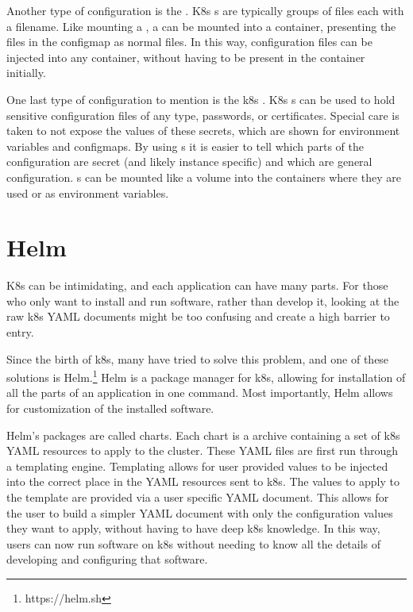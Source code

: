 \documentclass[11pt,twoside]{article}
\begin{document}
Another type of configuration is the .  K8s s are typically
groups of files each with a filename.  Like mounting a , a 
can be mounted into a container, presenting the files in the configmap as normal files.
In this way, configuration files can be injected into any container,
without having to be present in the container initially.

One last type of configuration to mention is the k8s .  K8s s can
be used to hold sensitive configuration files of any type, passwords, or certificates.  Special
care is taken to not expose the values of these secrets, which are shown for
environment variables and configmaps.  By using s it is easier to tell which
parts of the configuration are secret (and likely instance specific) and which are general
configuration.  s can be mounted like a volume into the containers
where they are used or as environment variables.

\section{Helm}

K8s can be intimidating, and each application can have many parts.  For those who only
want to install and run software, rather than develop it, looking at the raw
k8s YAML documents might be too confusing and create a high barrier to entry.

Since the birth of k8s, many have tried to solve this problem, and one of these
solutions is Helm.\footnote{https://helm.sh}  Helm is a package manager for k8s, allowing
for installation of all the parts of an application in one command.
Most importantly, Helm allows for customization of the installed software.

Helm's packages are called charts.  Each chart is a  archive containing a set of
k8s YAML resources to apply to the cluster.  These YAML files are first run through
a templating engine.  Templating allows for user provided values to be injected
into the correct place in the YAML resources sent to k8s.
The values to apply to the template are provided via a user specific YAML document.
This allows for the user to build a simpler YAML document with only the configuration
values they want to apply, without having to have deep k8s knowledge.  In this way,
users can now run software on k8s without needing to know all the details of developing
and configuring that software.
\end{document}
